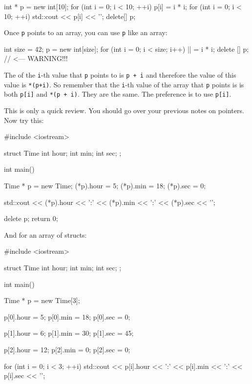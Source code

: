 \begin{center}
\begin{center}
\begin{consolethree}[escapeinside=||]
int * p = new int[10];
for (int i = 0; i < 10; ++i)
{
    p[i] = i * i;
}
for (int i = 0; i < 10; ++i)
{
    std::cout << p[i] << '\n';
}
delete[] p;
\end{consolethree}

Once \texttt{p} points to an array, you can use \texttt{p} like an array:

\begin{consolethree}[escapeinside=||]
int size = 42;
p = new int[size];
for (int i = 0; i < size; i++)
{
    || = i * i;
}
delete [] p; // <--- WARNING!!!
\end{consolethree}

The  of the \texttt{i}-th value that \texttt{p} points to is \verb!p + i! and
therefore the value of this value is \verb!*(p+i)!. So remember that the \texttt{i}-th
value of the array that \texttt{p} points is is both \verb!p[i]! and \verb!*(p + i)!. They are
the same. The preference is to use \verb!p[i]!.

This is only a quick review. You should go over your previous notes on
pointers. Now try this:

\begin{consolethree}[escapeinside=||]
#include <iostream>

struct Time
{
    int hour;
    int min;
    int sec;
};

int main()
{
    Time * p = new Time;
    (*p).hour = 5;
    (*p).min = 18;
    (*p).sec = 0;

    std::cout << (*p).hour << ':'
              << (*p).min << ':'
              << (*p).sec << '\n';

    delete p;
    return 0;
}
\end{consolethree}

And for an array of structs:

\begin{consolethree}[escapeinside=||]
#include <iostream>

struct Time
{
    int hour;
    int min;
    int sec;
};

int main()
{
    Time * p = new Time[3];

    p[0].hour = 5;
    p[0].min = 18;
    p[0].sec = 0;

    p[1].hour = 6;
    p[1].min = 30;
    p[1].sec = 45;

    p[2].hour = 12;
    p[2].min = 0;
    p[2].sec = 0;

    for (int i = 0; i < 3; ++i)
    {
        std::cout << p[i].hour << ':'
                  << p[i].min << ':'
                  << p[i].sec << '\n';
    }

}
\end{consolethree}
\end{center}
\end{center}
